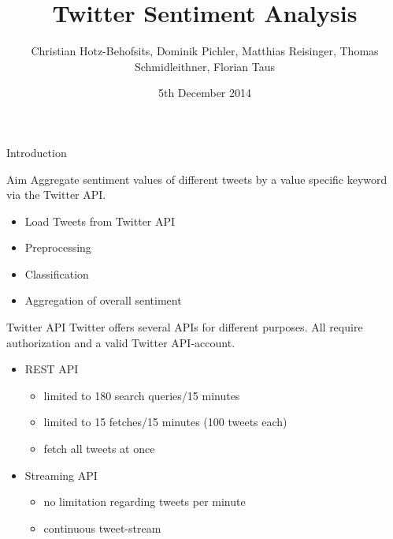 \documentclass{beamer}
\title[Twitter Sentiment Analysis]{Twitter Sentiment Analysis}
\author{Christian Hotz-Behofsits, Dominik Pichler, Matthias Reisinger, Thomas Schmidleithner, Florian Taus}
\institute{Advanced Internet Computing}
\date{5th December 2014}
\begin{document}
\begin{frame}
  \titlepage
\end{frame}
\begin{frame}{Introduction}
\begin{block}{Aim}
Aggregate sentiment values of different tweets by a value specific keyword via the Twitter API.
\end{block}
\begin{itemize}
   \item Load Tweets from Twitter API
   \item Preprocessing
   \item Classification
   \item Aggregation of overall sentiment
\end{itemize}
\end{frame}

\begin{frame}{Twitter API}
Twitter offers several APIs for different purposes. All require authorization and a valid Twitter API-account.

\begin{itemize}
	\item REST API
	\begin{itemize}
    	\item limited to 180 search queries/15 minutes
        \item limited to 15 fetches/15 minutes (100 tweets each)
        \item fetch all tweets at once
    \end{itemize}
    \item Streaming API
	\begin{itemize}
    	\item no limitation regarding tweets per minute
        \item continuous tweet-stream
    \end{itemize}
\end{itemize}
\end{frame}

\end{document}
